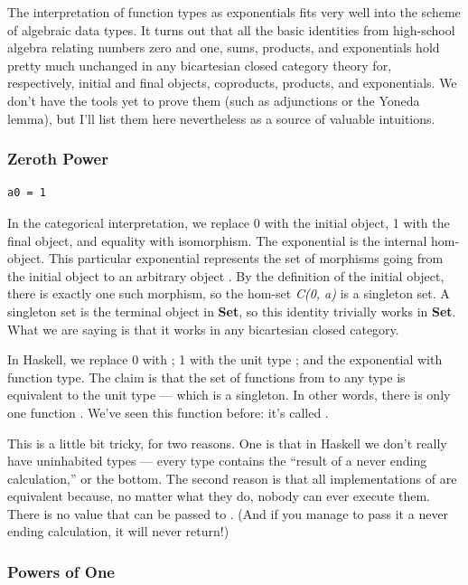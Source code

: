 The interpretation of function types as exponentials fits very well into
the scheme of algebraic data types. It turns out that all the basic
identities from high-school algebra relating numbers zero and one, sums,
products, and exponentials hold pretty much unchanged in any bicartesian
closed category theory for, respectively, initial and final objects,
coproducts, products, and exponentials. We don't have the tools yet to
prove them (such as adjunctions or the Yoneda lemma), but I'll list them
here nevertheless as a source of valuable intuitions.

\subsubsection{Zeroth Power}\label{zeroth-power}

\begin{verbatim}
a0 = 1
\end{verbatim}

In the categorical interpretation, we replace 0 with the initial object,
1 with the final object, and equality with isomorphism. The exponential
is the internal hom-object. This particular exponential represents the
set of morphisms going from the initial object to an arbitrary object
. By the definition of the initial object, there is exactly
one such morphism, so the hom-set \emph{C(0, a)} is a singleton set. A
singleton set is the terminal object in \textbf{Set}, so this identity
trivially works in \textbf{Set}. What we are saying is that it works in
any bicartesian closed category.

In Haskell, we replace 0 with ; 1 with the unit type
\code{()}; and the exponential with function type. The claim is that
the set of functions from  to any type  is
equivalent to the unit type --- which is a singleton. In other words,
there is only one function . We've seen
this function before: it's called .

This is a little bit tricky, for two reasons. One is that in Haskell we
don't really have uninhabited types --- every type contains the ``result
of a never ending calculation,'' or the bottom. The second reason is
that all implementations of  are equivalent because, no
matter what they do, nobody can ever execute them. There is no value
that can be passed to . (And if you manage to pass it a
never ending calculation, it will never return!)

\subsubsection{Powers of One}\label{powers-of-one}

